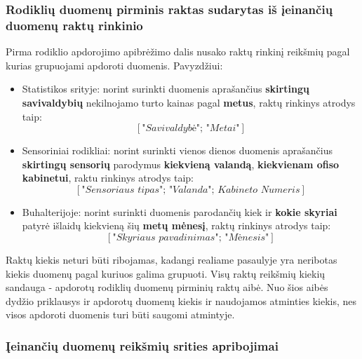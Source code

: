 \documentclass{VUMIFPSbakalaurinis}
\begin{document}
\subsubsection{Rodiklių duomenų pirminis raktas sudarytas iš įeinančių duomenų raktų rinkinio}

Pirma rodiklio apdorojimo apibrėžimo dalis nusako raktų rinkinį reikšmių pagal kurias grupuojami apdoroti duomenis. Pavyzdžiui:
\begin{itemize}
    \item Statistikos srityje: norint surinkti duomenis aprašančius \textbf{skirtingų savivaldybių} nekilnojamo turto kainas pagal \textbf{metus}, raktų rinkinys atrodys taip: \[[\textit{"Savivaldybė"; "Metai"}]\]
    \item Sensoriniai rodikliai: norint surinkti vienos dienos duomenis aprašančius \textbf{skirtingų sensorių} parodymus \textbf{kiekvieną valandą}, \textbf{kiekvienam ofiso kabinetui}, raktu rinkinys atrodys taip: \[[\textit{"Sensoriaus tipas"; "Valanda"; Kabineto Numeris}]\] 
    \item Buhalterijoje: norint surinkti duomenis parodančių kiek ir \textbf{kokie skyriai} patyrė išlaidų kiekvieną šių \textbf{metų mėnesį}, raktų rinkinys atrodys taip: \[[\textit{"Skyriaus pavadinimas"; "Mėnesis"}]\] 
\end{itemize}  \par
Raktų kiekis neturi būti ribojamas, kadangi realiame pasaulyje yra neribotas kiekis duomenų pagal kuriuos galima grupuoti. Visų raktų reikšmių kiekių sandauga - apdorotų rodiklių duomenų pirminių raktų aibė. Nuo šios aibės dydžio priklausys ir apdorotų duomenų kiekis ir naudojamos atminties kiekis, nes visos apdoroti duomenis turi būti saugomi atmintyje. 

\subsubsection{Įeinančių duomenų reikšmių srities apribojimai}
\end{document}
